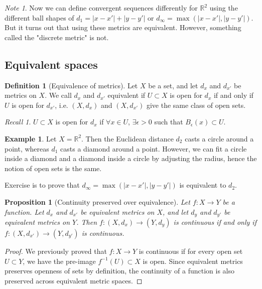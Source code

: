 \documentclass{article}
\theoremstyle{definition}
\newtheorem{defn}{Definition}[section]
\newtheorem{exmp}{Example}[section]
\theoremstyle{plain}%
\newtheorem{prop}[thm]{Proposition}
\theoremstyle{remark}
\newtheorem*{note}{Note}
\newtheorem*{rec}{Recall}
\newcommand{\R}{\mathbb{R}}
\begin{document}
\begin{note}
Now we can define convergent sequences differently for $\R^2$ using the different ball shapes of $d_1 = |x-x'| + |y-y'|$ or $d_{\infty} = \max(|x-x'|, |y-y'|)$. But it turns out that using these metrics are equivalent. However, something called the "discrete metric" is not.
\end{note}

\subsection{Equivalent spaces}

\begin{defn}[Equivalence of metrics]
Let $X$ be a set, and let $d_x$ and $d_{x'}$ be metrics on $X$. We call $d_x$ and $d_{x'}$ equivalent if $U \subset X$ is open for $d_x$ if and only if $U$ is open for $d_{x'}$, i.e. $(X,d_x)$ and $(X, d_{x'})$ give the same class of open sets.
\end{defn}

\begin{rec}
$U \subset X$ is open for $d_x$ if $\forall x \in U$, $\exists \epsilon > 0$ such that $B_{\epsilon}(x) \subset U$.
\end{rec}

\begin{exmp}
Let $X = \R^2$. Then the Euclidean distance $d_2$ casts a circle around a point, whereas $d_1$ casts a diamond around a point. However, we can fit a circle inside a diamond and a diamond inside a circle by adjusting the radius, hence the notion of open sets is the same.

Exercise is to prove that $d_{\infty} = \max(|x-x'|, |y-y'|)$ is equivalent to $d_2$.
\end{exmp}

\begin{prop}[Continuity preserved over equivalence]
Let $f : X \to Y$ be a function. Let $d_x$ and $d_{x'}$ be equivalent metrics on $X$, and let $d_y$ and $d_{y'}$ be equivalent metrics on $Y$. Then $f: (X,d_x) \to (Y,d_y)$ is continuous if and only if $f: (X, d_{x'}) \to (Y, d_{y'})$ is continuous.
\end{prop}

\begin{proof}
We previously proved that $f:X \to Y$ is continuous if for every open set $U \subset Y$, we have the pre-image $f^{-1}(U) \subset X$ is open. Since equivalent metrics preserves openness of sets by definition, the continuity of a function is also preserved across equivalent metric spaces.
\end{proof}
\end{document}
